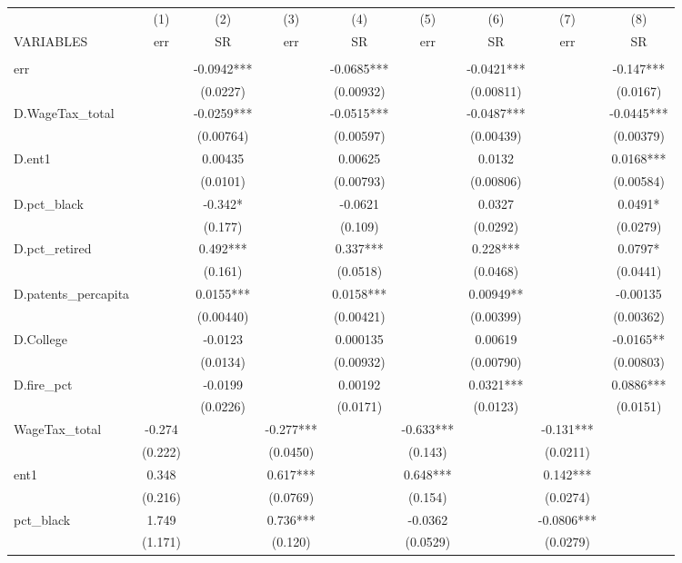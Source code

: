 \begin{tabular}{lcccccccc} \hline
 & (1) & (2) & (3) & (4) & (5) & (6) & (7) & (8) \\
VARIABLES & err & SR & err & SR & err & SR & err & SR \\ \hline
 &  &  &  &  &  &  &  &  \\
err &  & -0.0942*** &  & -0.0685*** &  & -0.0421*** &  & -0.147*** \\
 &  & (0.0227) &  & (0.00932) &  & (0.00811) &  & (0.0167) \\
D.WageTax\_total &  & -0.0259*** &  & -0.0515*** &  & -0.0487*** &  & -0.0445*** \\
 &  & (0.00764) &  & (0.00597) &  & (0.00439) &  & (0.00379) \\
D.ent1 &  & 0.00435 &  & 0.00625 &  & 0.0132 &  & 0.0168*** \\
 &  & (0.0101) &  & (0.00793) &  & (0.00806) &  & (0.00584) \\
D.pct\_black &  & -0.342* &  & -0.0621 &  & 0.0327 &  & 0.0491* \\
 &  & (0.177) &  & (0.109) &  & (0.0292) &  & (0.0279) \\
D.pct\_retired &  & 0.492*** &  & 0.337*** &  & 0.228*** &  & 0.0797* \\
 &  & (0.161) &  & (0.0518) &  & (0.0468) &  & (0.0441) \\
D.patents\_percapita &  & 0.0155*** &  & 0.0158*** &  & 0.00949** &  & -0.00135 \\
 &  & (0.00440) &  & (0.00421) &  & (0.00399) &  & (0.00362) \\
D.College &  & -0.0123 &  & 0.000135 &  & 0.00619 &  & -0.0165** \\
 &  & (0.0134) &  & (0.00932) &  & (0.00790) &  & (0.00803) \\
D.fire\_pct &  & -0.0199 &  & 0.00192 &  & 0.0321*** &  & 0.0886*** \\
 &  & (0.0226) &  & (0.0171) &  & (0.0123) &  & (0.0151) \\
WageTax\_total & -0.274 &  & -0.277*** &  & -0.633*** &  & -0.131*** &  \\
 & (0.222) &  & (0.0450) &  & (0.143) &  & (0.0211) &  \\
ent1 & 0.348 &  & 0.617*** &  & 0.648*** &  & 0.142*** &  \\
 & (0.216) &  & (0.0769) &  & (0.154) &  & (0.0274) &  \\
pct\_black & 1.749 &  & 0.736*** &  & -0.0362 &  & -0.0806*** &  \\
 & (1.171) &  & (0.120) &  & (0.0529) &  & (0.0279) &  \\

\end{tabular}
